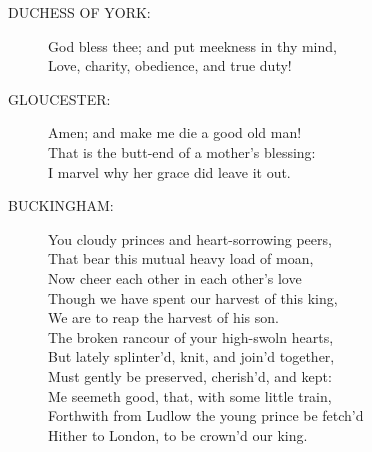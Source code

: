 \documentclass{article}
\begin{document}
\begin{description}
\item[DUCHESS OF YORK:] 
\hspace{1pt}God bless thee; and put meekness in thy mind,\\
\hspace{1pt}Love, charity, obedience, and true duty!\\
\end{description}
\begin{description}
\item[GLOUCESTER:] 
\hspace{1pt}  Amen; and make me die a good old man!\\
\hspace{1pt}That is the butt-end of a mother's blessing:\\
\hspace{1pt}I marvel why her grace did leave it out.\\
\end{description}
\begin{description}
\item[BUCKINGHAM:] 
\hspace{1pt}You cloudy princes and heart-sorrowing peers,\\
\hspace{1pt}That bear this mutual heavy load of moan,\\
\hspace{1pt}Now cheer each other in each other's love\\
\hspace{1pt}Though we have spent our harvest of this king,\\
\hspace{1pt}We are to reap the harvest of his son.\\
\hspace{1pt}The broken rancour of your high-swoln hearts,\\
\hspace{1pt}But lately splinter'd, knit, and join'd together,\\
\hspace{1pt}Must gently be preserved, cherish'd, and kept:\\
\hspace{1pt}Me seemeth good, that, with some little train,\\
\hspace{1pt}Forthwith from Ludlow the young prince be fetch'd\\
\hspace{1pt}Hither to London, to be crown'd our king.\\
\end{description}
\end{document}
